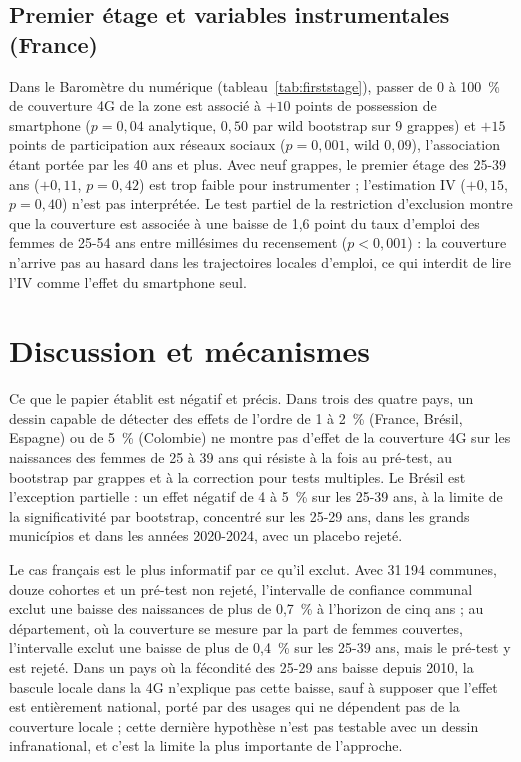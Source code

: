 \documentclass[11pt,a4paper]{article}
\begin{document}


\subsection{Premier étage et variables instrumentales (France)}

Dans le Baromètre du numérique (tableau~\ref{tab:firststage}), passer de 0 à 100~\% de couverture 4G de la zone est associé à $+10$ points de possession de smartphone ($p = 0{,}04$ analytique, $0{,}50$ par wild bootstrap sur 9 grappes) et $+15$ points de participation aux réseaux sociaux ($p = 0{,}001$, wild $0{,}09$), l'association étant portée par les 40 ans et plus. Avec neuf grappes, le premier étage des 25-39 ans ($+0{,}11$, $p = 0{,}42$) est trop faible pour instrumenter ; l'estimation IV ($+0{,}15$, $p = 0{,}40$) n'est pas interprétée. Le test partiel de la restriction d'exclusion montre que la couverture est associée à une baisse de 1,6 point du taux d'emploi des femmes de 25-54 ans entre millésimes du recensement ($p < 0{,}001$) : la couverture n'arrive pas au hasard dans les trajectoires locales d'emploi, ce qui interdit de lire l'IV comme l'effet du smartphone seul.



\section{Discussion et mécanismes}

Ce que le papier établit est négatif et précis. Dans trois des quatre pays, un dessin capable de détecter des effets de l'ordre de 1 à 2~\% (France, Brésil, Espagne) ou de 5~\% (Colombie) ne montre pas d'effet de la couverture 4G sur les naissances des femmes de 25 à 39 ans qui résiste à la fois au pré-test, au bootstrap par grappes et à la correction pour tests multiples. Le Brésil est l'exception partielle : un effet négatif de 4 à 5~\% sur les 25-39 ans, à la limite de la significativité par bootstrap, concentré sur les 25-29 ans, dans les grands municípios et dans les années 2020-2024, avec un placebo rejeté.

Le cas français est le plus informatif par ce qu'il exclut. Avec 31\,194 communes, douze cohortes et un pré-test non rejeté, l'intervalle de confiance communal exclut une baisse des naissances de plus de 0,7~\% à l'horizon de cinq ans ; au département, où la couverture se mesure par la part de femmes couvertes, l'intervalle exclut une baisse de plus de 0,4~\% sur les 25-39 ans, mais le pré-test y est rejeté. Dans un pays où la fécondité des 25-29 ans baisse depuis 2010, la bascule locale dans la 4G n'explique pas cette baisse, sauf à supposer que l'effet est entièrement national, porté par des usages qui ne dépendent pas de la couverture locale ; cette dernière hypothèse n'est pas testable avec un dessin infranational, et c'est la limite la plus importante de l'approche.
\end{document}
